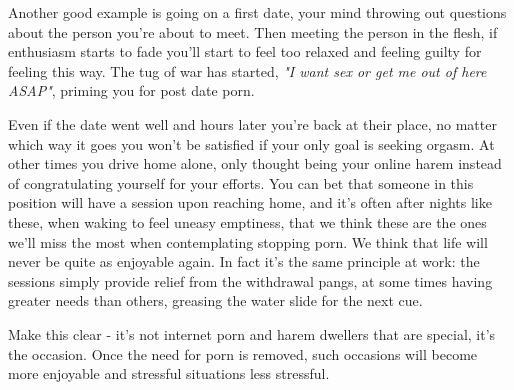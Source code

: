 \documentclass[easypeasy.tex]{subfiles}
\begin{document}
Another good example is going on a first date, your mind throwing out questions about the person you're about to meet. Then meeting the person in the flesh, if enthusiasm starts to fade you'll start to feel too relaxed and feeling guilty for feeling this way. The tug of war has started, \textit{"I want sex or get me out of here ASAP"}, priming you for post date porn.

Even if the date went well and hours later you're back at their place, no matter which way it goes you won't be satisfied if your only goal is seeking orgasm. At other times you drive home alone, only thought being your online harem instead of congratulating yourself for your efforts. You can bet that someone in this position will have a session upon reaching home, and it's often after nights like these, when waking to feel uneasy emptiness, that we think these are the ones we'll miss the most when contemplating stopping porn. We think that life will never be quite as enjoyable again. In fact it's the same principle at work: the sessions simply provide relief from the withdrawal pangs, at some times having greater needs than others, greasing the water slide for the next cue.

Make this clear - it's not internet porn and harem dwellers that are special, it's the occasion. Once the need for porn is removed, such occasions will become more enjoyable and stressful situations less stressful.
\end{document}
